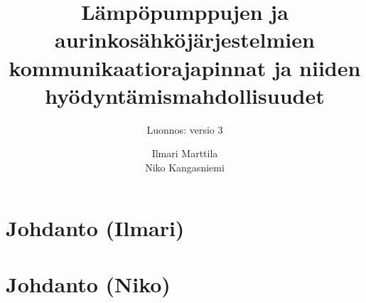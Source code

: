 \documentclass{tauthesis}
\begin{document}

\frontmatter


\title{Lämpöpumppujen ja aurinkosähköjärjestelmien kommunikaatiorajapinnat ja niiden hyödyntämismahdollisuudet}
\subtitle{Luonnos: versio 3}

\author{Ilmari Marttila \\ Niko Kangasniemi}






\keywords%
    {}

\maketitle




\tableofcontents

\listoffigures



\mainmatter
% 

\chapter{Johdanto (Ilmari)}
\label{ch:johdanto_ilmari}


\chapter{Johdanto (Niko)}
\label{ch:johdanto_niko}

\end{document}
